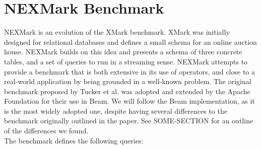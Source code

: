 \section{NEXMark Benchmark\cite{nexmark}}
NEXMark is an evolution of the XMark benchmark. XMark was initially designed for relational databases and defines a small schema for an online auction house. NEXMark builds on this idea and presents a schema of three concrete tables, and a set of queries to run in a streaming sense. NEXMark attempts to provide a benchmark that is both extensive in its use of operators, and close to a real-world application by being grounded in a well-known problem. The original benchmark proposed by Tucker et al. was adopted and extended by the Apache Foundation for their use in Beam\cite{nexmark-beam}. We will follow the Beam implementation, as it is the most widely adopted one, despite having several differences to the benchmark originally outlined in the paper. See SOME-SECTION for an outline of the differences we found. \\

The benchmark defines the following queries:

